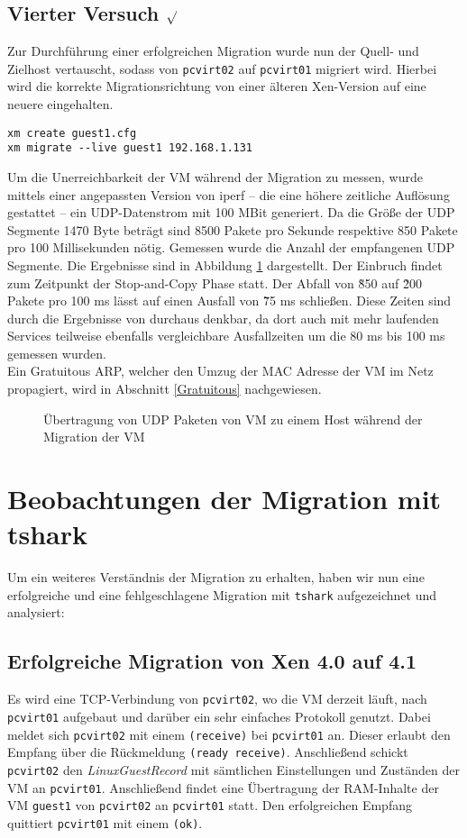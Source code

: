 \subsection {Vierter Versuch $\surd$ }
Zur Durchführung einer erfolgreichen Migration wurde nun der Quell- und Zielhost vertauscht, sodass von \verb#pcvirt02# auf \verb#pcvirt01# migriert wird. Hierbei wird die korrekte Migrationsrichtung von einer älteren Xen-Version auf eine neuere eingehalten.
\setupVerbatimOut
\begin{verbatim} 
xm create guest1.cfg
xm migrate --live guest1 192.168.1.131
\end{verbatim}

Um die Unerreichbarkeit der VM während der Migration zu messen, wurde mittels einer angepassten Version von iperf -- die eine höhere zeitliche Auflösung gestattet -- ein UDP-Datenstrom mit 100 MBit generiert. Da die Größe der UDP Segmente 1470 Byte beträgt sind 8500 Pakete pro Sekunde respektive 850 Pakete pro 100 Millisekunden nötig. Gemessen wurde die Anzahl der empfangenen UDP Segmente. Die Ergebnisse sind in Abbildung \ref{migration_plot} dargestellt. Der Einbruch findet zum Zeitpunkt der Stop-and-Copy Phase statt. Der Abfall von \~850 auf \~200 Pakete pro 100 ms lässt auf einen Ausfall von \~75 ms schließen. Diese Zeiten sind durch die Ergebnisse von \cite{clark2005live} durchaus denkbar, da dort auch mit mehr laufenden Services teilweise ebenfalls vergleichbare Ausfallzeiten um die 80 ms bis 100 ms gemessen wurden.
\\
Ein Gratuitous ARP, welcher den Umzug der MAC Adresse der VM im Netz propagiert, wird in Abschnitt \ref{Gratuitous} nachgewiesen.

\begin{figure}

\caption{Übertragung von UDP Paketen von VM zu einem Host während der Migration der VM}
\label{migration_plot}
\end{figure}

\section{Beobachtungen der Migration mit tshark} \label{mig_tcpdump}
Um ein weiteres Verständnis der Migration zu erhalten, haben wir nun eine erfolgreiche und eine fehlgeschlagene Migration mit \verb#tshark# aufgezeichnet und analysiert:

\subsection{Erfolgreiche Migration von Xen 4.0 auf 4.1}
Es wird eine TCP-Verbindung von \verb#pcvirt02#, wo die VM derzeit läuft, nach \verb#pcvirt01# aufgebaut und darüber ein sehr einfaches Protokoll genutzt. Dabei meldet sich \verb#pcvirt02# mit einem \verb|(receive)| bei \verb#pcvirt01# an. Dieser erlaubt den Empfang über die Rückmeldung \verb|(ready receive)|. Anschließend schickt \verb#pcvirt02# den \emph{LinuxGuestRecord} mit sämtlichen Einstellungen und Zuständen der VM an \verb#pcvirt01#. Anschließend findet eine Übertragung der RAM-Inhalte der VM \verb#guest1# von \verb#pcvirt02#  an \verb#pcvirt01# statt. Den erfolgreichen Empfang quittiert \verb#pcvirt01# mit einem \verb|(ok)|.

